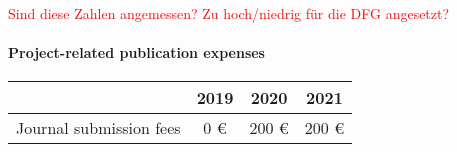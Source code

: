 \documentclass[a4paper,12pt]{article}
\begin{document}
\noindent \textcolor{red}{Sind diese Zahlen angemessen? Zu hoch/niedrig f\"ur die DFG angesetzt?}




\paragraph{Project-related publication expenses}

\begin{center}
\begin{tabular}{l c c c}
 & 2019 & 2020 & 2021 \\
\hline 
Journal submission fees & 0 \euro{} & 200 \euro{} & 200 \euro{} \\
\end{tabular}
\end{center}






\end{document}
